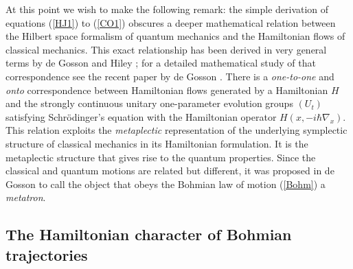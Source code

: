\documentclass[12pt]{article}%
\begin{document}
At this point we wish to make the following remark: the simple derivation of
equations (\ref{HJ1}) to (\ref{CO1}) obscures a deeper mathematical relation
between the Hilbert space formalism of quantum mechanics and the Hamiltonian
flows of classical mechanics. This exact relationship has been derived in very
general terms by de Gosson and Hiley \cite{mdgbh10}; for a detailed
mathematical study of that correspondence see the recent paper by de Gosson
\cite{go15}. There is a \emph{one-to-one} and \emph{onto} correspondence
between Hamiltonian flows generated by a Hamiltonian $H$ and the strongly
continuous unitary one-parameter evolution groups $(U_{t})$ satisfying
Schr\"{o}dinger's equation with the Hamiltonian operator $H(x,-i\hbar
\nabla_{x})$. This relation exploits the \emph{metaplectic} representation of
the underlying symplectic structure \cite{Birk,go15} of classical mechanics in
its Hamiltonian formulation. It is the metaplectic structure that gives rise
to the quantum properties. Since the classical and quantum motions are related
but different, it was proposed in de Gosson \cite{ICP} to call the object that
obeys the Bohmian law of motion (\ref{Bohm}) a \emph{metatron}.

\subsection{The Hamiltonian character of Bohmian trajectories}

\label{sec:hbt}
\end{document}
